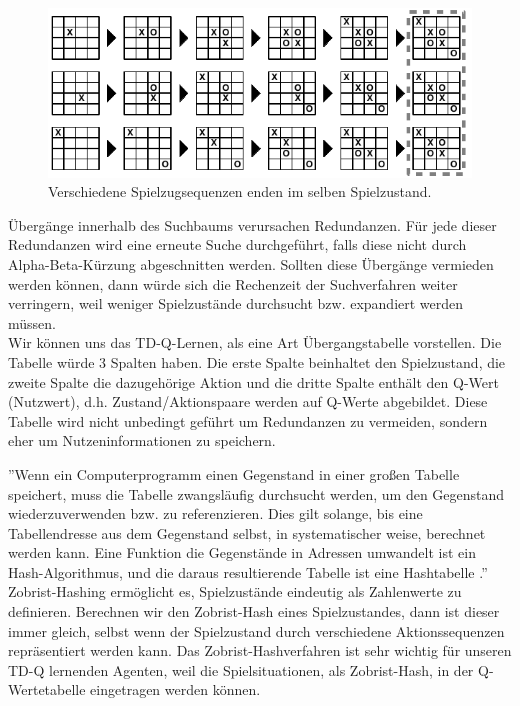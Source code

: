 \begin{figure}[!htbp]
  \centering
  \includegraphics{inhalt/abbildungen/transitionen_tictactoe.pdf}
  \caption{Verschiedene Spielzugsequenzen enden im selben Spielzustand.}
  \label{fig:transitionen_tictactoe}
\end{figure} 

Übergänge innerhalb des Suchbaums verursachen Redundanzen. Für jede dieser Redundanzen wird eine erneute Suche durchgeführt, falls diese nicht durch Alpha-Beta-Kürzung abgeschnitten werden. Sollten diese Übergänge vermieden werden können, dann würde sich die Rechenzeit der Suchverfahren weiter verringern, weil weniger Spielzustände durchsucht bzw. expandiert werden müssen. \\

Wir können uns das TD-Q-Lernen, als eine Art Übergangstabelle vorstellen. Die Tabelle würde 3 Spalten haben. Die erste Spalte beinhaltet den Spielzustand, die zweite Spalte die dazugehörige Aktion und die dritte Spalte enthält den Q-Wert (Nutzwert), d.h. Zustand/Aktionspaare werden auf Q-Werte abgebildet. Diese Tabelle wird nicht unbedingt geführt um Redundanzen zu vermeiden, sondern eher um Nutzeninformationen zu speichern.

''Wenn ein Computerprogramm einen Gegenstand in einer großen Tabelle speichert, muss die Tabelle zwangsläufig durchsucht werden, um den Gegenstand wiederzuverwenden bzw. zu referenzieren. Dies gilt solange, bis eine Tabellendresse aus dem Gegenstand selbst, in systematischer weise, berechnet werden kann. Eine Funktion die Gegenstände in Adressen umwandelt ist ein Hash-Algorithmus, und die daraus resultierende Tabelle ist eine Hashtabelle \cite[3]{Zobrist}.'' \\

Zobrist-Hashing ermöglicht es, Spielzustände eindeutig als Zahlenwerte zu definieren. Berechnen wir den Zobrist-Hash eines Spielzustandes, dann ist dieser immer gleich, selbst wenn der Spielzustand durch verschiedene Aktionssequenzen repräsentiert werden kann. Das Zobrist-Hashverfahren ist sehr wichtig für unseren TD-Q lernenden Agenten, weil die Spielsituationen, als Zobrist-Hash, in der Q-Wertetabelle eingetragen werden können.


